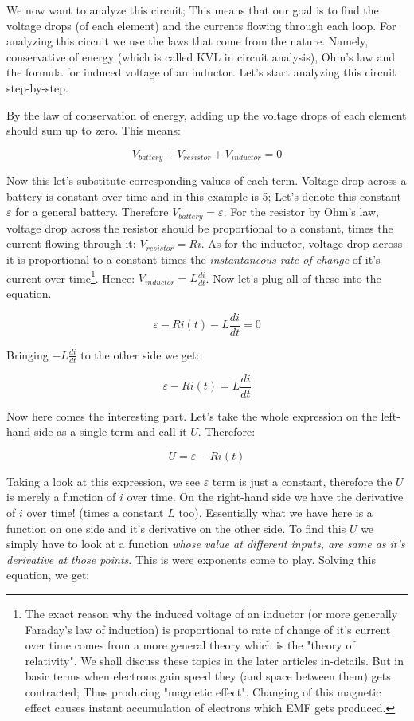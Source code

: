 \documentclass{article}
\begin{document}
	We now want to analyze this circuit; This means that our goal is to find the voltage drops (of each element) and the currents flowing through each loop. For analyzing this circuit we use the laws that come from the nature. Namely, conservative of energy (which is called KVL in circuit analysis), Ohm's law and the formula for induced voltage of an inductor. Let's start analyzing this circuit step-by-step.
	
	By the law of conservation of energy, adding up the voltage drops of each element should sum up to zero. This means:
	
	$$V_{battery} + V_{resistor} + V_{inductor} = 0$$
	
	Now this let's substitute corresponding values of each term. Voltage drop across a battery is constant over time and in this example is 5; Let's denote this constant $\varepsilon$ for a general battery. Therefore $V_{battery} = \varepsilon$. For the resistor by Ohm's law, voltage drop across the resistor should be proportional to a constant, times the current flowing through it: $V_{resistor} = Ri$. As for the inductor, voltage drop across it is proportional to a constant times the \textit{instantaneous rate of change} of it's current over time\footnote[1]{The exact reason why the induced voltage of an inductor (or more generally Faraday's law of induction) is proportional to rate of change of it's current over time comes from a more general theory which is the "theory of relativity". We shall discuss these topics in the later articles in-details. But in basic terms when electrons gain speed they (and space between them) gets contracted; Thus producing "magnetic effect". Changing of this magnetic effect causes instant accumulation of electrons which EMF gets produced.}. Hence: $V_{inductor} = L\frac{di}{dt}$. Now let's plug all of these into the equation. 
	
	$$\varepsilon - Ri(t) - L\frac{di}{dt} = 0 $$
	
	Bringing $-L\frac{di}{dt}$ to the other side we get:
	
	$$\varepsilon - Ri(t) = L\frac{di}{dt} $$
	
	Now here comes the interesting part. Let's take the whole expression on the left-hand side as a single term and call it $U$. Therefore:
	
	$$ U = \varepsilon - Ri(t) $$
	
	Taking a look at this expression, we see $\varepsilon$ term is just a constant, therefore the $U$ is merely a function of $i$ over time. On the right-hand side we have the derivative of $i$ over time! (times a constant $L$ too). Essentially what we have here is a function on one side and it's derivative on the other side. To find this $U$ we simply have to look at a function \textit{whose value at different inputs, are same as it's derivative at those points}. This is were exponents come to play.
	Solving this equation, we get:
	
\end{document}
